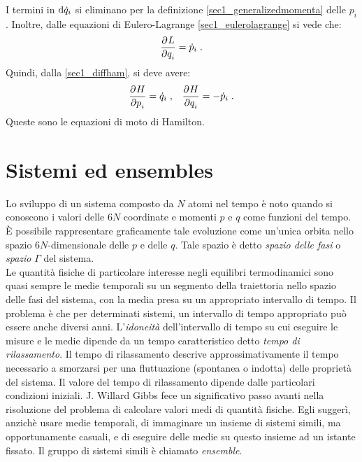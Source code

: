 I termini in $\mathrm{d}{\dot{q}_i}$ si eliminano per la definizione \eqref{sec1_generalizedmomenta} delle $p_i$. Inoltre, dalle equazioni di Eulero-Lagrange \eqref{sec1_eulerolagrange} si vede che:
\begin{equation}
\frac{\partial^{}L}{\partial q_i^{}}=\dot{p}_i\;.
\end{equation}
Quindi, dalla \eqref{sec1_diffham}, si deve avere:
\begin{align}
&\frac{\partial^{}H}{\partial p_i^{}}=\dot{q}_i\;, &\frac{\partial^{}H}{\partial q_i^{}}=-\dot{p}_i\;.
\end{align}
Queste sono le equazioni di moto di Hamilton.
\pagebreak
\section{Sistemi ed ensembles}
Lo sviluppo di un sistema composto da $N$ atomi nel tempo è noto quando si conoscono i valori delle $6N$ coordinate e momenti $p$ e $q$ 
come funzioni del tempo. È possibile rappresentare graficamente tale evoluzione come un'unica orbita nello spazio $6N$-dimensionale 
delle $p$ e delle $q$. Tale spazio è detto \textit{spazio delle fasi} o \textit{spazio} $\Gamma$ del sistema. \\

Le quantità fisiche di particolare interesse negli equilibri termodinamici sono quasi sempre le medie temporali su un segmento della 
traiettoria nello spazio delle fasi del sistema, con la media presa su un appropriato intervallo di tempo. Il problema è che per 
determinati sistemi, un intervallo di tempo appropriato può essere anche diversi anni. L'\textit{idoneità} dell'intervallo di tempo su 
cui eseguire le misure e le medie dipende da un tempo caratteristico detto \textit{tempo di rilassamento}. Il tempo di rilassamento 
descrive approssimativamente il tempo necessario a smorzarsi per una fluttuazione (spontanea o indotta) delle proprietà del sistema. 
Il valore del tempo di rilassamento dipende dalle particolari condizioni iniziali. J. Willard Gibbs fece un significativo passo avanti 
nella risoluzione del problema di calcolare valori medi di quantità fisiche. Egli suggerì, anzichè usare medie temporali, di immaginare 
un insieme di sistemi simili, ma opportunamente casuali, e di eseguire delle medie su questo insieme ad un istante fissato. Il gruppo 
di sistemi simili è chiamato \textit{ensemble}. \\

